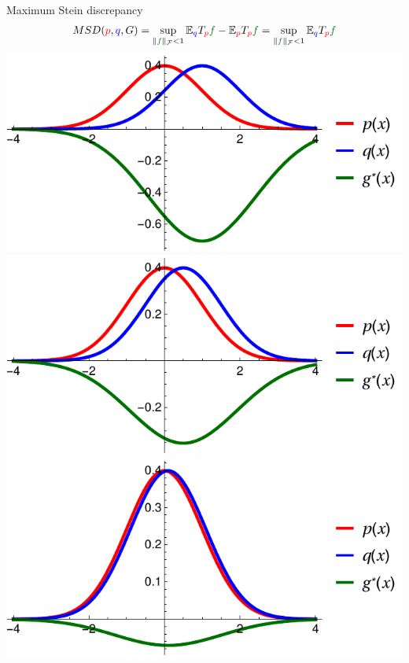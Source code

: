 \begin{frame}
\begin{columns}
\begin{column}{.33\linewidth}
\begin{block}{Maximum Stein discrepancy}
\large
\begin{align*}
MSD({\color{red} p},{ \color{blue} q},G) = \sup_{   \| {\color{mg} f} \|_\mathcal{F}<1} \ev_{{ \color{blue} q}} T_{\color{red} p} {\color{mg} f} - \ev_{{\color{red} p}} T_{\color{red} p} {\color{mg} f}  = \sup_{ \| {\color{mg} f} \|_\mathcal{F}<1} \ev_{{ \color{blue} q}} T_{\color{red} p} {\color{mg} f} 
\end{align*}
\vspace{2cm}
\centering
\includegraphics[scale=1.2]{../../presentation/img/s1.pdf}
\includegraphics[scale=1.2]{../../presentation/img/s05.pdf}\\
\includegraphics[scale=1.2]{../../presentation/img/s01.pdf}

\end{block}
\end{column}
\end{columns}
\end{frame}
